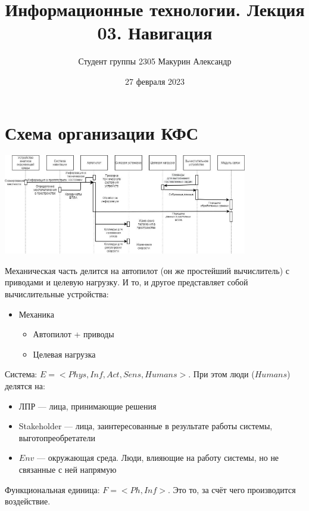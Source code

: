 \documentclass{article}
\title{Информационные технологии. Лекция 03. Навигация}
\author{Студент группы 2305 Макурин Александр}
\date{27 февраля 2023}
\begin{document}
\maketitle
\begin{sloppypar}
    \section{Схема организации КФС}
    \includegraphics*[width=0.8\textwidth]{./graphics/Схема организации КФС.jpg}

    Механическая часть делится на автопилот (он же простейший вычислитель) с приводами и целевую нагрузку. И то, и другое представляет собой вычислительные устройства:

    \begin{itemize}
        \item Механика
              \begin{itemize}
                  \item Автопилот + приводы
                  \item Целевая нагрузка
              \end{itemize}
    \end{itemize}

    Система: $E = <Phys, Inf, Act, Sens, Humans>$. При этом люди ($Humans$) делятся на:
    \begin{itemize}
        \item ЛПР — лица, принимающие решения
        \item Stakeholder — лица, заинтересованные в результате работы системы,
              выготопреобретатели
        \item $Env$ — окружающая среда. Люди, влияющие на работу системы, но
              не связанные с ней напрямую
    \end{itemize}


    Функциональная единица: $F=<Ph, Inf>$. Это то, за счёт чего производится воздействие.


\end{sloppypar}
\end{document}
